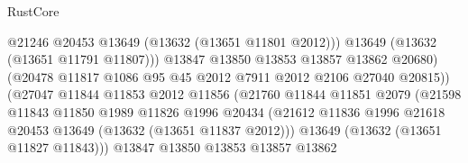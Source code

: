 \begin{lexlean}{RustCore}
\begin{coremodule}
                                            @21246
                                            @20453
                                            @13649
                                            (@13632 (@13651 @11801 @2012)))
                                          @13649
                                          (@13632 (@13651 @11791 @11807)))
                                        @13847
                                        @13850
                                        @13853
                                        @13857
                                        @13862
                                        @20680)
                                      (@20478
                                        @11817
                                        @1086
                                        @95
                                        @45
                                        @2012
                                        @7911
                                        @2012
                                        @2106
                                        @27040
                                        @20815))
                                    (@27047
                                      @11844
                                      @11853
                                      @2012
                                      @11856
                                      (@21760
                                        @11844
                                        @11851
                                        @2079
                                        (@21598
                                          @11843
                                          @11850
                                          @1989
                                          @11826
                                          @1996
                                          @20434
                                          (@21612
                                            @11836
                                            @1996
                                            @21618
                                            @20453
                                            @13649
                                            (@13632 (@13651 @11837 @2012)))
                                          @13649
                                          (@13632 (@13651 @11827 @11843)))
                                        @13847
                                        @13850
                                        @13853
                                        @13857
                                        @13862

\end{coremodule}
\end{lexlean}

